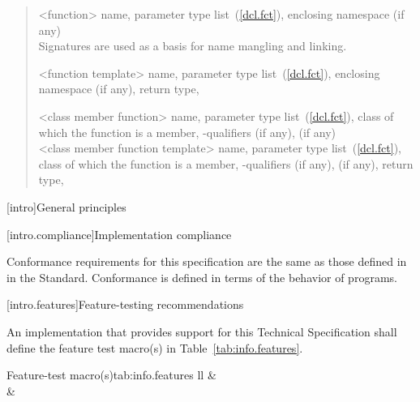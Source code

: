 \begin{quote}
%
<function> name, parameter type list~(\ref{dcl.fct}),  enclosing 
namespace (if any)%
\\
\enternote Signatures are used as a basis for
name mangling and linking.\exitnote

%
<function template> name, parameter type list~(\ref{dcl.fct}), enclosing namespace (if any),
return type,

%
<class member function> name, parameter type list~(\ref{dcl.fct}), class of which the
function is a member, \cv-qualifiers (if any),
  (if any)%
\\

%
<class member function template> name, parameter type list~(\ref{dcl.fct}), class of which the
function is a member, \cv-qualifiers (if any),
 (if any), return type,
\end{quote}

[intro]{General principles}

[intro.compliance]{Implementation compliance}

\pnum
Conformance requirements for this specification are the same as those 
defined in  in the \Cpp Standard.
\enternote 
Conformance is defined in terms of the behavior of programs.
\exitnote

[intro.features]{Feature-testing recommendations}

\pnum
An implementation that provides support for this Technical Specification shall 
define the feature test macro(s) in Table~\ref{tab:info.features}.

\renewcommand{\thetable}{\Alph{table}}
\begin{floattable}{Feature-test macro(s)}{tab:info.features}
{ll}
\topline
{} &  \\
\capsep
{}  &       \\
\end{floattable}


